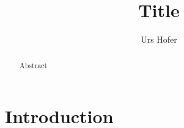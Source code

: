 \documentclass{article}
\title{Title}
\author{Urs Hofer}
\begin{document}
\maketitle

\begin{abstract}
    Abstract
\end{abstract}

\section{Introduction}
\end{document}

